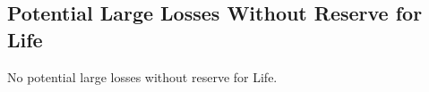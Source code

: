 \subsection*{Potential Large Losses Without Reserve for Life}
                        
                        No potential large losses without reserve for Life.
                        